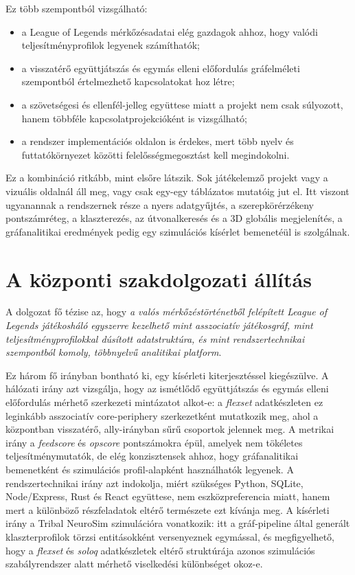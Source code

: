 Ez több szempontból vizsgálható:

\begin{itemize}
    \item a League of Legends mérkőzésadatai elég gazdagok ahhoz, hogy valódi teljesítményprofilok legyenek számíthatók;
    \item a visszatérő együttjátszás és egymás elleni előfordulás gráfelméleti szempontból értelmezhető kapcsolatokat hoz létre;
    \item a szövetségesi és ellenfél-jelleg együttese miatt a projekt nem csak súlyozott, hanem többféle kapcsolatprojekcióként is vizsgálható;
    \item a rendszer implementációs oldalon is érdekes, mert több nyelv és futtatókörnyezet közötti felelősségmegosztást kell megindokolni.
\end{itemize}

Ez a kombináció ritkább, mint elsőre látszik. Sok játékelemző projekt vagy a vizuális oldalnál áll meg, vagy csak egy-egy táblázatos mutatóig jut el. Itt viszont ugyanannak a rendszernek része a nyers adatgyűjtés, a szerepkörérzékeny pontszámréteg, a klaszterezés, az útvonalkeresés és a 3D globális megjelenítés, a gráfanalitikai eredmények pedig egy szimulációs kísérlet bemenetéül is szolgálnak.

\section{A központi szakdolgozati állítás}

A dolgozat fő tézise az, hogy \emph{a valós mérkőzéstörténetből felépített League of Legends játékosháló egyszerre kezelhető mint asszociatív játékosgráf, mint teljesítményprofilokkal dúsított adatstruktúra, és mint rendszertechnikai szempontból komoly, többnyelvű analitikai platform}.

Ez három fő irányban bontható ki, egy kísérleti kiterjesztéssel kiegészülve. A hálózati irány azt vizsgálja, hogy az ismétlődő együttjátszás és egymás elleni előfordulás mérhető szerkezeti mintázatot alkot-e: a \textit{flexset} adatkészleten ez leginkább asszociatív core-periphery szerkezetként mutatkozik meg, ahol a központban visszatérő, ally-irányban sűrű csoportok jelennek meg. A metrikai irány a \textit{feedscore} és \textit{opscore} pontszámokra épül, amelyek nem tökéletes teljesítménymutatók, de elég konzisztensek ahhoz, hogy gráfanalitikai bemenetként és szimulációs profil-alapként használhatók legyenek. A rendszertechnikai irány azt indokolja, miért szükséges Python, SQLite, Node/Express, Rust és React együttese, nem eszközpreferencia miatt, hanem mert a különböző részfeladatok eltérő természete ezt kívánja meg. A kísérleti irány a Tribal NeuroSim szimulációra vonatkozik: itt a gráf-pipeline által generált klaszterprofilok törzsi entitásokként versenyeznek egymással, és megfigyelhető, hogy a \textit{flexset} és \textit{soloq} adatkészletek eltérő struktúrája azonos szimulációs szabályrendszer alatt mérhető viselkedési különbséget okoz-e.

